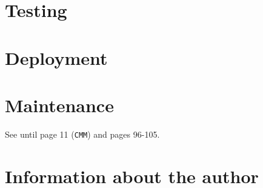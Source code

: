 \documentclass{llncs}
\newcommand{\labelsec}[1]{\label{sec:#1}}
\begin{document}

\section{Testing}
\labelsec{testing}

\section{Deployment}
\labelsec{Deployment}

\section{Maintenance}
\labelsec{Maintenance}
\newpage
See \cite{natMol09} until page 11 (\texttt{CMM}) and pages 96-105.

\section{Information about the author}
\labelsec{Author}
\end{document}

